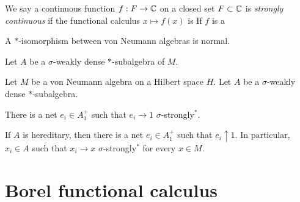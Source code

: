\documentclass{../../large}
\begin{document}
\begin{prb}

We say a continuous function $f:F\to\mathbb{C}$ on a closed set $F\subset\mathbb{C}$ is \emph{strongly continuous} if the functional calculus $x\mapsto f(x)$ is 
If $f$ is a 


A $*$-isomorphism between von Neumann algebras is normal.

Let $A$ be a $\sigma$-weakly dense $*$-subalgebra of $M$.
\end{prb}



\begin{prb}
Let $M$ be a von Neumann algebra on a Hilbert space $H$.
Let $A$ be a $\sigma$-weakly dense $*$-subalgebra.
\begin{parts}
\item There is a net $e_i\in A_1^+$ such that $e_i\to1$ $\sigma$-strongly$^*$.
\item If $A$ is hereditary, then there is a net $e_i\in A_1^+$ such that $e_i\uparrow1$.
In particular, $x_i\in A$ such that $x_i\to x$ $\sigma$-strongly$^*$ for every $x\in M$.
\end{parts}
\end{prb}



\section{Borel functional calculus}
\end{document}
